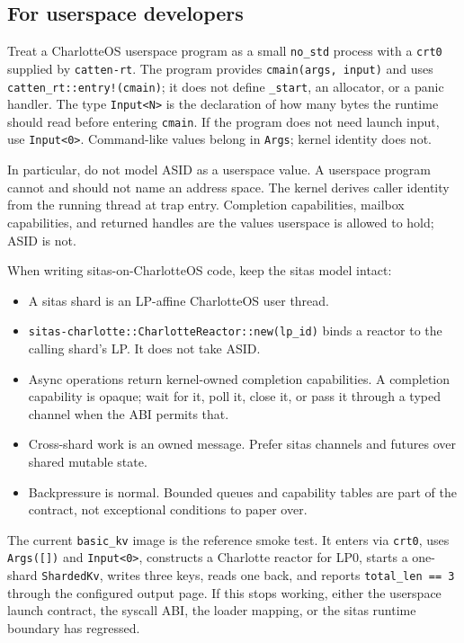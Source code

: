 \subsection{For userspace developers}

Treat a CharlotteOS userspace program as a small \texttt{no\_std} process with
a \texttt{crt0} supplied by \texttt{catten-rt}. The program provides
\texttt{cmain(args, input)} and uses \texttt{catten\_rt::entry!(cmain)}; it
does not define \texttt{\_start}, an allocator, or a panic handler. The type
\texttt{Input<N>} is the declaration of how many bytes the runtime should read
before entering \texttt{cmain}. If the program does not need launch input, use
\texttt{Input<0>}. Command-like values belong in \texttt{Args}; kernel
identity does not.

In particular, do not model ASID as a userspace value. A userspace program
cannot and should not name an address space. The kernel derives caller identity
from the running thread at trap entry. Completion capabilities, mailbox
capabilities, and returned handles are the values userspace is allowed to
hold; ASID is not.

When writing sitas-on-CharlotteOS code, keep the sitas model intact:
\begin{itemize}
    \item A sitas shard is an LP-affine CharlotteOS user thread.
    \item \texttt{sitas-charlotte::CharlotteReactor::new(lp\_id)} binds a
        reactor to the calling shard's LP. It does not take ASID.
    \item Async operations return kernel-owned completion capabilities. A
        completion capability is opaque; wait for it, poll it, close it, or
        pass it through a typed channel when the ABI permits that.
    \item Cross-shard work is an owned message. Prefer sitas channels and
        futures over shared mutable state.
    \item Backpressure is normal. Bounded queues and capability tables are part
        of the contract, not exceptional conditions to paper over.
\end{itemize}

The current \texttt{basic\_kv} image is the reference smoke test. It enters via
\texttt{crt0}, uses \texttt{Args([])} and \texttt{Input<0>}, constructs a
Charlotte reactor for LP0, starts a one-shard \texttt{ShardedKv}, writes three
keys, reads one back, and reports \texttt{total\_len == 3} through the
configured output page. If this stops working, either the userspace launch
contract, the syscall ABI, the loader mapping, or the sitas runtime boundary has
regressed.


